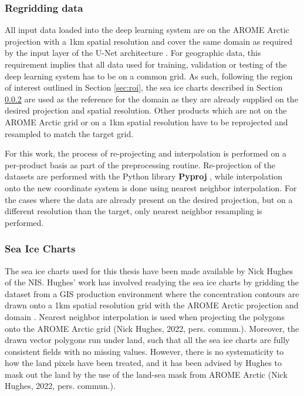 \documentclass[../main/thesis]{subfiles}
\begin{document}
\subsubsection{Regridding data}
\label{sec:regrid}
All input data loaded into the deep learning system are on the AROME Arctic projection with a 1km spatial resolution and cover the same domain as required by the input layer of the U-Net architecture \citep{Ronneberger2015}. For geographic data, this requirement implies that all data used for training, validation or testing of the deep learning system has to be on a common grid. As such, following the region of interest outlined in Section \ref{sec:roi}, the sea ice charts described in Section \ref{sec:data_seaicecharts} are used as the reference for the domain as they are already supplied on the desired projection and spatial resolution. Other products which are not on the AROME Arctic grid or on a 1km spatial resolution have to be reprojected and resampled to match the target grid.

For this work, the process of re-projecting and interpolation is performed on a per-product basis as part of the preprocessing routine. Re-projection of the datasets are performed with the Python library \textbf{Pyproj} \citep{Snow2022}, while interpolation onto the new coordinate system is done using nearest neighbor interpolation. For the cases where the data are already present on the desired projection, but on a different resolution than the target, only nearest neighbor resampling is performed.

\subsubsection{Sea Ice Charts}
\label{sec:data_seaicecharts}
The sea ice charts used for this thesis have been made available by Nick Hughes of the NIS. Hughes' work has involved readying the sea ice charts by gridding the dataset from a GIS production environment \citep{Dinessen2020} where the concentration contours are drawn onto a 1km spatial resolution grid with the AROME Arctic projection and domain \citep{Mueller2017}. Nearest neighbor interpolation is used when projecting the polygons onto the AROME Arctic grid (Nick Hughes, 2022, pers. commun.). Moreover, the drawn vector polygons run under land, such that all the sea ice charts are fully consistent fields with no missing values. However, there is no systematicity to how the land pixels have been treated, and it has been advised by Hughes to mask out the land by the use of the land-sea mask from AROME Arctic (Nick Hughes, 2022, pers. commun.).
\end{document}
